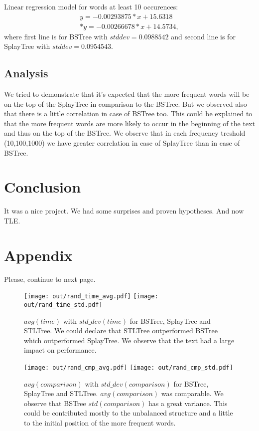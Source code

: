 \documentclass[12pt,a4paper]{article}
\begin{document}
Linear regression model for words at least 10 occurences:  
\begin{align} 
y = -0.00293875*x + 15.6318 \\*
y = -0.00266678*x + 14.5734, 
\end{align} 
where first line is for BSTree with $stddev=0.0988542$ and second line is for SplayTree with $stddev=0.0954543$. 

\subsection{Analysis} 
We tried to demonstrate that it's expected that the more frequent words will be on the top of the SplayTree in comparison to the BSTree. But we observed also that there is a little correlation in case of BSTree too. This could be explained to that the more frequent words are more likely to occur in the beginning of the text and thus on the top of the BSTree. We observe that in each frequency treshold (10,100,1000) we have greater correlation in case of SplayTree than in case of BSTree. 

\section*{Conclusion} 
It was a nice project. We had some surprises and proven hypotheses. And now TLE. 

\newpage
\section*{Appendix}
\label{appendix} 

Please, continue to next page.

\begin{figure}[h]
  \centering
  \texttt{[image: out/rand\_time\_avg.pdf]}
  \texttt{[image: out/rand\_time\_std.pdf]}
  \caption{$avg(time)$ with $std\_dev(time)$ for BSTree, SplayTree and STLTree. We could declare that STLTree outperformed BSTree which outperformed SplayTree. We observe that the text had a large impact on performance.}
  \label{fig:avg_std_time_plots}
\end{figure}

\begin{figure}[h]
  \centering
  \texttt{[image: out/rand\_cmp\_avg.pdf]}
  \texttt{[image: out/rand\_cmp\_std.pdf]}
  \caption{$avg(comparison)$ with $std\_dev(comparison)$ for BSTree, SplayTree and STLTree. $avg(comparison)$ was comparable. We observe that BSTree $std(comparison)$ has a great variance. This could be contributed mostly to the unbalanced structure and a little to the initial position of the more frequent words.}
  \label{fig:avg_std_cmp_plots}
\end{figure}
\end{document}
